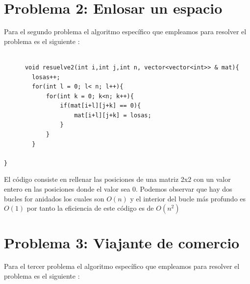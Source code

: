 \documentclass[11pt,openany]{book}
\begin{document}
\section{Problema 2: Enlosar un espacio }
Para el segundo problema el algoritmo específico que empleamos para resolver el problema es el siguiente : 

\begin{lstlisting}

      void resuelve2(int i,int j,int n, vector<vector<int>> & mat){
        losas++;
        for(int l = 0; l< n; l++){
            for(int k = 0; k<n; k++){
                if(mat[i+l][j+k] == 0){
                    mat[i+l][j+k] = losas;
                }
            }
        }
    
}
\end{lstlisting}
El código consiste en rellenar las posiciones de una matriz 2x2 con un valor entero en las posiciones donde el valor sea 0.
Podemos observar que hay dos bucles for anidados los cuales son $O(n)$ y el interior del bucle más profundo es $O(1)$ por tanto la eficiencia 
de este código es de $O(n^2)$

\section{Problema 3: Viajante de comercio }
Para el tercer problema el algoritmo específico que empleamos para resolver el problema es el siguiente : 
\end{document}
